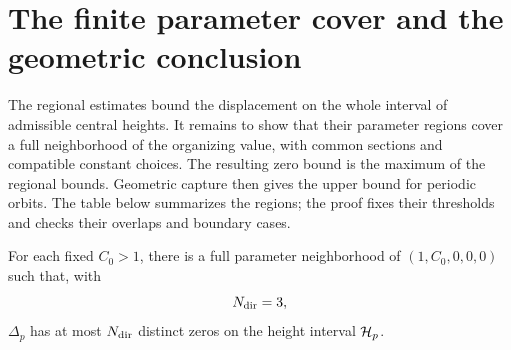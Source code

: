 \section{The finite parameter cover and the geometric conclusion}
\label{sec:direct-parameter-cover}

The regional estimates bound the displacement on the whole interval
of admissible central heights. It remains to show that their parameter
regions cover a full neighborhood of the organizing value, with common
sections and compatible constant choices. The resulting zero bound is
the maximum of the regional bounds. Geometric capture then gives the
upper bound for periodic orbits. The table below summarizes the regions;
the proof fixes their thresholds and checks their overlaps and boundary
cases.



\begin{proposition}
\label{prop:direct-uniform-displacement}
For each fixed \(C_0>1\), there is a full parameter
neighborhood of \((1,C_0,0,0,0)\) such that, with
\[
 N_{\rm dir}=3,
\]
\(\Delta_p\) has at most \(N_{\rm dir}\)
distinct zeros on the height interval \(\mathcal H_p\).
\end{proposition}

